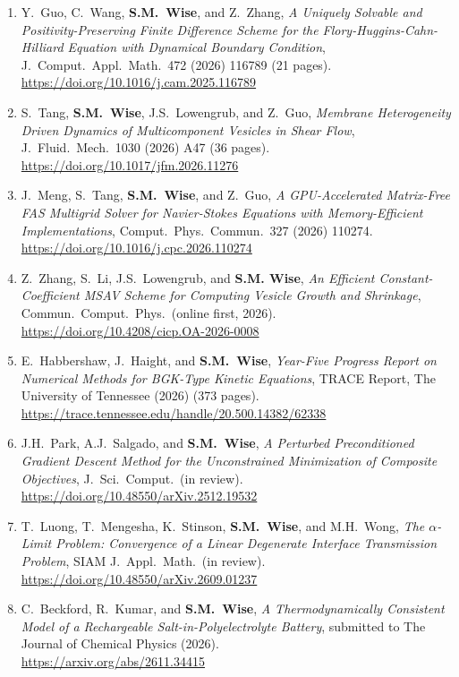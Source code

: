 \documentclass[10pt,letterpaper]{article}
\begin{document}
\begin{enumerate}
	\item
Y.~Guo, C.~Wang, \textbf{S.M.~Wise}, and Z.~Zhang, {\sl A Uniquely Solvable and Positivity-Preserving Finite Difference Scheme for the Flory-Huggins-Cahn-Hilliard Equation with Dynamical Boundary Condition}, J.~Comput.~Appl.~Math.~472 (2026) 116789 (21 pages).
	\\
\url{https://doi.org/10.1016/j.cam.2025.116789}

	\item
S.~Tang, \textbf{S.M.~Wise}, J.S.~Lowengrub, and Z.~Guo, {\sl Membrane Heterogeneity Driven Dynamics of Multicomponent Vesicles in Shear
Flow}, J.~Fluid.~Mech.~1030 (2026) A47 (36 pages).
	\\
\url{https://doi.org/10.1017/jfm.2026.11276}

	\item
J.~Meng, S.~Tang, \textbf{S.M.~Wise}, and Z.~Guo, {\sl A GPU-Accelerated Matrix-Free FAS Multigrid Solver for Navier-Stokes Equations with Memory-Efficient Implementations}, Comput.~Phys.~Commun.~327 (2026) 110274.
	\\
\url{https://doi.org/10.1016/j.cpc.2026.110274}

	\item
Z.~Zhang, S.~Li, J.S.~Lowengrub, and \textbf{S.M. Wise}, {\sl An Efficient Constant-Coefficient MSAV Scheme for Computing Vesicle Growth and Shrinkage}, Commun.~Comput.~Phys.~(online first, 2026).
	\\
\url{https://doi.org/10.4208/cicp.OA-2026-0008}

	\item
E.~Habbershaw, J.~Haight, and \textbf{S.M.~Wise}, {\sl Year-Five Progress Report on Numerical Methods for BGK-Type Kinetic Equations}, TRACE Report, The University of Tennessee (2026) (373 pages).
	\\
\url{https://trace.tennessee.edu/handle/20.500.14382/62338}

	\item
J.H.~Park, A.J.~Salgado, and \textbf{S.M.~Wise}, {\sl A Perturbed Preconditioned Gradient Descent Method for the Unconstrained Minimization of Composite Objectives}, J.~Sci.~Comput.~(in review).
	\\
\url{https://doi.org/10.48550/arXiv.2512.19532}

	\item
T.~Luong, T.~Mengesha, K.~Stinson, \textbf{S.M.~Wise}, and M.H.~Wong, {\sl The $\alpha$-Limit Problem: Convergence of a Linear Degenerate Interface Transmission Problem}, SIAM J.~Appl.~Math.~(in review).
	\\
\url{https://doi.org/10.48550/arXiv.2609.01237}

	\item
C.~Beckford, R.~Kumar, and \textbf{S.M.~Wise}, {\sl A Thermodynamically Consistent Model of a Rechargeable Salt-in-Polyelectrolyte Battery}, submitted to The Journal of Chemical Physics (2026).
	\\
\url{https://arxiv.org/abs/2611.34415}

	\end{enumerate}
	
\end{document}

